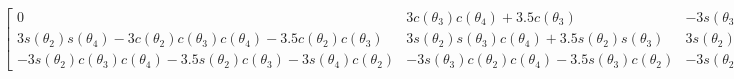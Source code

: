 \documentclass[12pt]{article}
\begin{document}
$\left[\begin{matrix}0 & 3 c{\left(\theta_{3} \right)} c{\left(\theta_{4} \right)} + 3.5 c{\left(\theta_{3} \right)} & - 3 s{\left(\theta_{3} \right)} s{\left(\theta_{4} \right)}\\3 s{\left(\theta_{2} \right)} s{\left(\theta_{4} \right)} - 3 c{\left(\theta_{2} \right)} c{\left(\theta_{3} \right)} c{\left(\theta_{4} \right)} - 3.5 c{\left(\theta_{2} \right)} c{\left(\theta_{3} \right)} & 3 s{\left(\theta_{2} \right)} s{\left(\theta_{3} \right)} c{\left(\theta_{4} \right)} + 3.5 s{\left(\theta_{2} \right)} s{\left(\theta_{3} \right)} & 3 s{\left(\theta_{2} \right)} s{\left(\theta_{4} \right)} c{\left(\theta_{3} \right)} - 3 c{\left(\theta_{2} \right)} 
c{\left(\theta_{4} \right)}\\- 3 s{\left(\theta_{2} \right)} c{\left(\theta_{3} \right)} c{\left(\theta_{4} \right)} - 3.5 s{\left(\theta_{2} \right)} c{\left(\theta_{3} \right)} - 3 s{\left(\theta_{4} \right)} c{\left(\theta_{2} \right)} & - 3 s{\left(\theta_{3} \right)} c{\left(\theta_{2} \right)} c{\left(\theta_{4} \right)} - 3.5 s{\left(\theta_{3} \right)} c{\left(\theta_{2} \right)} & - 3 s{\left(\theta_{2} \right)} c{\left(\theta_{4} \right)} - 3 s{\left(\theta_{4} \right)} c{\left(\theta_{2} \right)} c{\left(\theta_{3} \right)}\end{matrix}\right]$
\end{document}
